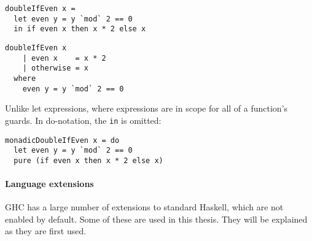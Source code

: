 \begin{multicols}{2}
\begin{verbatim}
doubleIfEven x =
  let even y = y `mod` 2 == 0
  in if even x then x * 2 else x
\end{verbatim}
\columnbreak
\begin{verbatim}
doubleIfEven x
    | even x    = x * 2
    | otherwise = x
  where
    even y = y `mod` 2 == 0
\end{verbatim}
\end{multicols}

Unlike let expressions, where expressions are in scope for all of a function's
guards.  In do-notation, the \verb|in| is omitted:

\begin{verbatim}
monadicDoubleIfEven x = do
  let even y = y `mod` 2 == 0
  pure (if even x then x * 2 else x)
\end{verbatim}

\paragraph{Language extensions}
GHC has a large number of extensions to standard Haskell, which are not enabled
by default.  Some of these are used in this thesis.  They will be explained as
they are first used.

